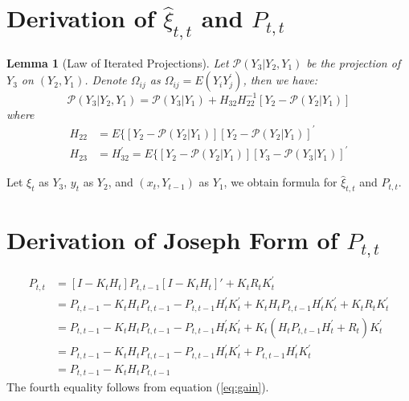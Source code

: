 \documentclass[12pt]{article}
\newtheorem{lemma}{Lemma}
\numberwithin{equation}{section}
\begin{document}
\printbibliography
\appendix
\section{Derivation of $\hat{\xi}_{t,t}$ and $P_{t,t}$}

\begin{lemma}[Law of Iterated Projections] \label{lem:1}
    Let $\mathcal{P}(Y_3|Y_2,Y_1)$ be the projection of $Y_3$ on $(Y_2, Y_1)$. Denote $\Omega_{ij}$ as $\Omega_{ij} = E(Y_iY_j^{'})$, then we have:
    \[
        \mathcal{P}(Y_3|Y_2,Y_1) = \mathcal{P}(Y_3|Y_1)+H_{32}H_{22}^{-1}[Y_2 - \mathcal{P}(Y_2|Y_1)]
    \]
    where 
    \begin{align*}
        H_{22} &= E\{[Y_2-\mathcal{P}(Y_2|Y_1)][Y_2-\mathcal{P}(Y_2|Y_1)]^{'} \\
        H_{23} &= H_{32}^{'} = E\{[Y_2-\mathcal{P}(Y_2|Y_1)][Y_3-\mathcal{P}(Y_3|Y_1)]^{'} 
    \end{align*}

\end{lemma}

Let $\xi_t$ as $Y_3$, $y_t$ as $Y_2$, and $(x_t,Y_{t-1})$ as $Y_1$, we obtain formula for $\hat{\xi}_{t,t}$ and $P_{t,t}$.

\section{Derivation of Joseph Form of $P_{t,t}$} \label{ap:joseph}
\begin{align*}
    P_{t,t} &= [I - K_tH_t]P_{t,t-1}[I - K_tH_t]' + K_tR_tK_t^{'} \\
    &= P_{t,t-1} - K_tH_tP_{t,t-1} - P_{t,t-1}H_t^{'}K_t^{'} + K_tH_tP_{t,t-1}H_t^{'}K_t^{'} + K_tR_tK_t^{'} \\
    &= P_{t,t-1} - K_tH_tP_{t,t-1} - P_{t,t-1}H_t^{'}K_t^{'} + K_t(H_tP_{t,t-1}H_t^{'} + R_t)K_t^{'} \\
    &= P_{t,t-1} - K_tH_tP_{t,t-1} - P_{t,t-1}H_t^{'}K_t^{'} + P_{t,t-1}H_t^{'}K_t^{'} \\
    &= P_{t,t-1} - K_tH_tP_{t,t-1}
\end{align*}
The fourth equality follows from equation (\ref{eq:gain}).
\end{document}
